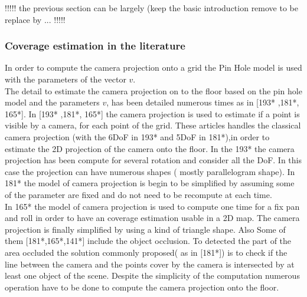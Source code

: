 !!!!! the previous section can be largely (keep the basic introduction remove to be replace by ... !!!!!
\fi
\subsubsection{Coverage estimation in the literature}

 In order to compute the camera projection onto a grid the Pin Hole model is used with the parameters of the vector $v$.\\
 
The detail to estimate the camera projection on to the floor based on the pin hole model and the parameters $v$, has been detailed numerous times as in  [193* ,181*, 165*]. In [193* ,181*, 165*] the camera projection is used to estimate if a point is visible by a camera, for each point of the grid. These articles handles the classical camera projection (with the 6DoF in 193* and 5DoF in 181*),in order to estimate the 2D projection of the camera onto the floor. 
In the 193* the camera projection has been compute for several rotation and consider all the DoF. In this case the projection can have numerous shapes ( mostly parallelogram shape).
In 181* the  model of camera projection is begin to be simplified by assuming some of the parameter are fixed and do not need to be recompute at each time.  \\
In 165* the model of camera projection is used to compute one time for a fix pan and roll in order to have an coverage estimation usable in a 2D map. The camera projection is finally simplified by using a kind of triangle shape.
 Also Some of them [181*,165*,141*] include the object occlusion. To detected the part of the area occluded the solution commonly proposed( as in [181*]) is to check  if the line between the camera and the points cover by the camera is intersected by at least one object of the scene. 
  Despite the simplicity of the computation numerous operation have to be done to compute the camera projection onto the floor. \\

